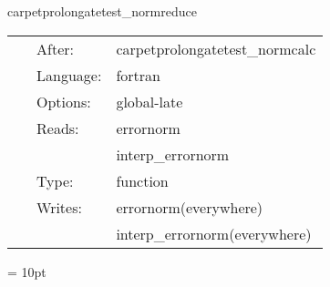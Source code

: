 \vspace{5mm}


\hspace{5mm} carpetprolongatetest\_normreduce 

\hspace{5mm}{\it calculate error norm } 


\hspace{5mm}

 \begin{tabular*}{160mm}{cll} 
~ & After:  & carpetprolongatetest\_normcalc \\ 
~ & Language:  & fortran \\ 
~ & Options:  & global-late \\ 
~ & Reads:  & errornorm \\ 
~& ~ &interp\_errornorm\\ 
~ & Type:  & function \\ 
~ & Writes:  & errornorm(everywhere) \\ 
~& ~ &interp\_errornorm(everywhere)\\ 
\end{tabular*} 



\vspace{5mm}\parskip = 10pt 
